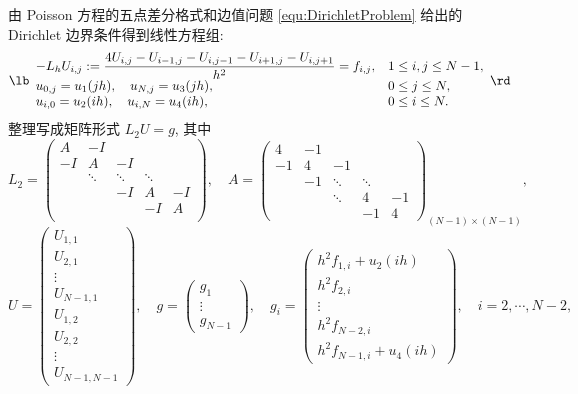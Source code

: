 \documentclass[UTF8, a4paper, 12pt, oneside, onecolumn]{article}
\begin{document}
由 Poisson 方程的五点差分格式和边值问题 \eqref{equ:DirichletProblem} 给出的 Dirichlet 边界条件得到线性方程组:
\begin{equation*}%
	\lb\begin{array}{ll}
		-L_h U_{i, j} := \dfrac{4U_{i, j} - U_{i - 1, j} - U_{i, j - 1} - U_{i + 1, j} - U_{i, j + 1}}{h^2} = f_{i, j},	&	1 \leq i, j \leq N - 1, \\
		u_{0, j} = u_1(jh),\quad u_{N, j} = u_3(jh),	&	0 \leq j \leq N, \\
		u_{i, 0} = u_2(ih),\quad u_{i, N} = u_4(ih),	&	0 \leq i \leq N.
	\end{array}\rd
\end{equation*}
整理写成矩阵形式 $L_2 U = g$, 其中
$$L_2 = \begin{pmatrix}
		A	&	-I		&			&			&	\\
		-I	&	A		&	-I		&			&	\\
			&	\ddots	&	\ddots	&	\ddots	&	\\
			&			&	-I		&	A		&	-I	\\
			&			&			&	-I		&	A	\\
	\end{pmatrix},\quad A = \begin{pmatrix}
	4	&	-1	&		&		&	\\
	-1	&	4	&	-1	&		&	\\
		&	-1	&	\ddots	&	\ddots	&	\\
		&		&	\ddots	&	4	&	-1\\
		&		&		&	-1	&	4
	\end{pmatrix}_{(N - 1) \times (N - 1)},$$
$$U = \begin{pmatrix}
	U_{1, 1}\\
	U_{2, 1}\\
	\vdots\\
	U_{N - 1, 1}\\
	U_{1, 2}\\
	U_{2, 2}\\
	\vdots\\
	U_{N - 1, N - 1}
\end{pmatrix},\quad g = \begin{pmatrix}
	g_1\\
	\vdots\\
	g_{N - 1}
\end{pmatrix},\quad g_i = \begin{pmatrix}
	h^2 f_{1, i} + u_2(ih)\\
	h^2 f_{2, i}\\
	\vdots\\
	h^2 f_{N - 2, i}\\
	h^2 f_{N - 1, i} + u_4(ih)
\end{pmatrix},\quad i = 2, \cdots, N - 2,$$
\end{document}
